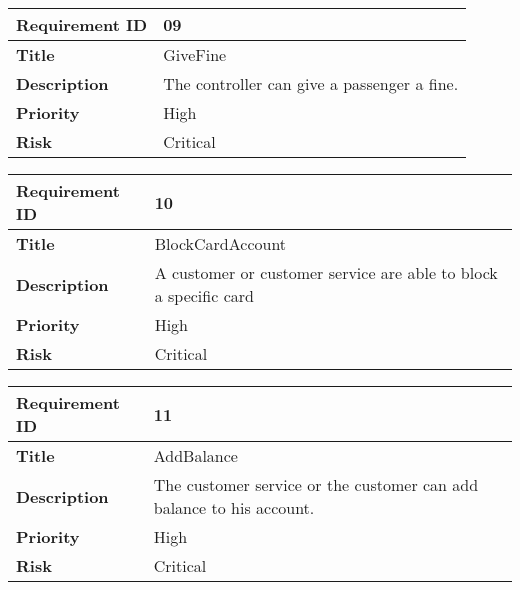 \begin{center}
	\def\arraystretch{1.5}%
    \begin{tabular}{ | p{5cm} | p{5cm} |}
    \hline
    	\textbf{Requirement ID} & 09 \\ \hline
		\textbf{Title} & GiveFine\\ \hline
		\textbf{Description} & The controller can give a passenger a fine.\\ \hline
		\textbf{Priority} & High\\ \hline
		\textbf{Risk} & Critical\\
      \hline
    \end{tabular}
\end{center}

\begin{center}
	\def\arraystretch{1.5}%
    \begin{tabular}{ | p{5cm} | p{5cm} |}
    \hline
    	\textbf{Requirement ID} & 10 \\ \hline
		\textbf{Title} & BlockCardAccount\\ \hline
		\textbf{Description} & A customer or customer service are able to block a specific card\\ \hline
		\textbf{Priority} & High\\ \hline
		\textbf{Risk} & Critical\\
      \hline
    \end{tabular}
\end{center}

\begin{center}
	\def\arraystretch{1.5}%
    \begin{tabular}{ | p{5cm} | p{5cm} |}
    \hline
    	\textbf{Requirement ID} & 11 \\ \hline
		\textbf{Title} & AddBalance\\ \hline
		\textbf{Description} & The customer service or the customer can add balance to his account.\\ \hline
		\textbf{Priority} & High\\ \hline
		\textbf{Risk} & Critical\\
      \hline
    \end{tabular}
\end{center}

